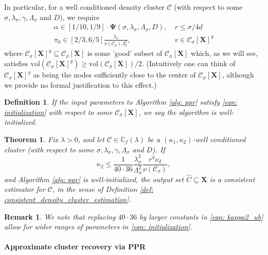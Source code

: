 \documentclass{article}
\newcommand{\vol}{\mathrm{vol}}
\newcommand{\1}{\mathbf{1}}
\newcommand{\Xbf}{\mathbf{X}}
\newcommand{\Cbb}{\mathbb{C}}
\newcommand{\Cset}{\mathcal{C}}
\newcommand{\Csig}{\Cset_{\sigma}}
\theoremstyle{aldenthm}
\newtheorem{theorem}{Theorem}
\newtheorem{definition}{Definition}
\theoremstyle{aldenrmrk}
\newtheorem{remark}{Remark}
\begin{document}
In particular, for a well conditioned density cluster $\Cset$ (with respect to some $\sigma, \lambda_{\sigma}, \gamma, \Lambda_{\sigma}$ and $D$), we require
\begin{align}
\label{eqn: initialization}
\alpha \in [1/10, 1/9] \cdot \mathbf{\Psi}(\sigma, \lambda_{\sigma}, \Lambda_{\sigma}, D), & ~r \leq \sigma/4d  \nonumber \\
\pi_0 \in [2/3, 6/5] \frac{\lambda_{\sigma}}{\nu(\Csig) \Lambda_{\sigma}^2}, & ~v \in \Csig[\Xbf]^g
\end{align}
where $\Csig[\Xbf]^g \subseteq \Csig[\Xbf]$ is some 'good' subset of $\Csig[\Xbf]$ which, as we will see, satisfies $\vol(\Csig[\Xbf]^g) \geq \vol(\Csig[\Xbf])/2$. (Intuitively one can think of $\Csig[\Xbf]^g$ as being the nodes sufficiently close to the center of $\Csig[\Xbf]$, although we provide no formal justification to this effect.)

\begin{definition}
	If the input parameters to Algorithm \ref{alg: ppr} satisfy \eqref{eqn: initialization} with respect to some $\Csig[\Xbf]$, we say the algorithm is  \emph{well-initialized}.
\end{definition}

\begin{theorem}
	\label{thm: consistent_recovery_of_density_clusters}
	Fix $\lambda > 0$, and let $\Cset \in \Cbb_f(\lambda)$ be a $(\kappa_1,\kappa_2)$-well conditioned cluster (with respect to some $\sigma, \lambda_{\sigma}, \gamma, \Lambda_{\sigma}$ and $D$). If
	\begin{equation}
	\label{eqn: kappa2_ub}
	\kappa_2 \leq \frac{1}{40 \cdot 36} \frac{\lambda_{\sigma}^2}{\Lambda_{\sigma}^2} \frac{r^d \nu_d}{\nu(\Csig)},
	\end{equation}
	and Algorithm \ref{alg: ppr} is well-initialized, the output set $\widehat{C} \subseteq \Xbf$ is a consistent estimator for $\Cset$, in the sense of Definition \ref{def: consistent_density_cluster_estimation}.
\end{theorem}

\begin{remark}
	We note that replacing $40 \cdot 36$ by larger constants in \eqref{eqn: kappa2_ub} allow for wider ranges of parameters in \eqref{eqn: initialization}. 
\end{remark}
\paragraph{Approximate cluster recovery via PPR}
\end{document}
